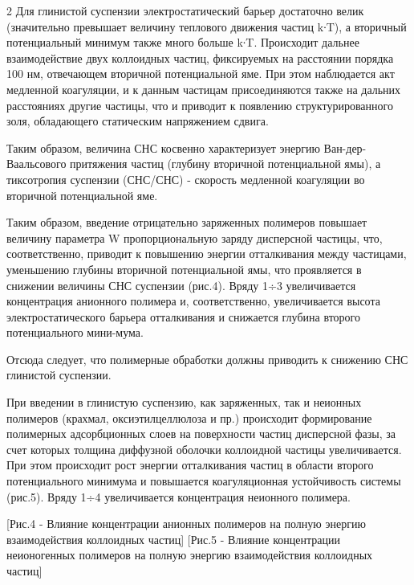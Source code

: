\begin{multicols}{2}
Для глинистой суспензии электростатический барьер достаточно велик
(значительно превышает величину теплового движения частиц k∙T), а
вторичный потенциальный минимум также много больше k∙T. Происходит
дальнее взаимодействие двух коллоидных частиц, фиксируемых на расстоянии
порядка 100 нм, отвечающем вторичной потенциальной яме. При этом
наблюдается акт медленной коагуляции, и к данным частицам присоединяются
также на дальних расстояниях другие частицы, что и приводит к появлению
структурированного золя, обладающего статическим напряжением сдвига.

Таким образом, величина СНС косвенно характеризует энергию
Ван-дер-Ваальсового притяжения частиц (глубину вторичной потенциальной
ямы), а тиксотропия суспензии
(СНС/СНС) - скорость медленной
коагуляции во вторичной потенциальной яме.

Таким образом, введение отрицательно заряженных полимеров повышает
величину параметра W пропорциональную заряду дисперсной частицы, что,
соответственно, приводит к повышению энергии отталкивания между
частицами, уменьшению глубины вторичной потенциальной ямы, что
проявляется в снижении величины СНС суспензии (рис.4). Вряду 1÷3
увеличивается концентрация анионного полимера и, соответственно,
увеличивается высота электростатического барьера отталкивания и
снижается глубина второго потенциального мини-мума.

Отсюда следует, что полимерные обработки должны приводить к снижению СНС
глинистой суспензии.

При введении в глинистую суспензию, как заряженных, так и неионных
полимеров (крахмал, оксиэтилцеллюлоза и пр.) происходит формирование
полимерных адсорбционных слоев на поверхности частиц дисперсной фазы, за
счет которых толщина диффузной оболочки коллоидной частицы
увеличивается. При этом происходит рост энергии отталкивания частиц в
области второго потенциального минимума и повышается коагуляционная
устойчивость системы (рис.5). Вряду 1÷4 увеличивается концентрация
неионного полимера.
\end{multicols}

\begin{figs}
    [Рис.4 - Влияние концентрации
анионных полимеров на полную энергию взаимодействия коллоидных частиц]
[Рис.5 - Влияние концентрации
неионогенных полимеров на полную энергию взаимодействия коллоидных
частиц]
\end{figs}

